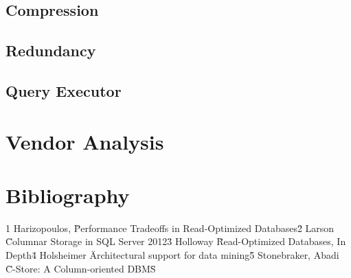 \documentclass[11pt]{article}
\begin{document}
\subsection{Compression}


\subsection{Redundancy}

\subsection{Query Executor} 

\section{Vendor Analysis}


\section{Bibliography}
1 Harizopoulos, \"Performance Tradeoffs in Read-Optimized Databases\"
2 Larson \"Columnar Storage in SQL Server 2012\"
3 Holloway \"Read-Optimized Databases, In Depth\"
4 Holsheimer \"Architectural support for data mining\"
5 Stonebraker, Abadi \"C-Store: A Column-oriented DBMS\"
\end{document}
